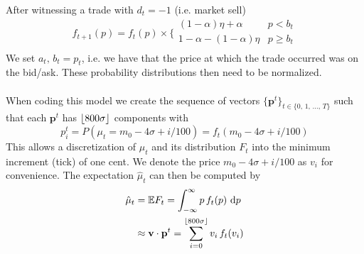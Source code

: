 \documentclass[11pt]{report}
\DeclarePairedDelimiter\floor{\lfloor}{\rfloor}
\begin{document}
    After witnessing a trade with $d_t = -1$ (i.e. market sell)
    \[
    f_{t+1}(p) = f_t(p) \times
    \bigg\{\begin{array}{cc}
        (1 - \alpha)\eta + \alpha & p < b_t \\
        1 - \alpha - (1 - \alpha)\eta & p \geq b_t \\
    \end{array} 
    \]    
    We set $a_t,\,b_t = p_t$, i.e. we have that the price at which the trade occurred 
    was on the bid/ask. These probability distributions then need to be normalized.\\\\
    When coding this model we create the sequence of vectors 
    $\{\mathbf{p}^t\}_{t \in \{0,\,1,\,...,\,T\}}$ such that each $\mathbf{p}^t$ has
    $\floor{800\sigma}$ components with
    \[
    p_i^t = P(\mu_t = m_0 - 4\sigma + i/100) = f_t(m_0 - 4\sigma + i/100)
    \]
    This allows a discretization of $\mu_t$ and its distribution $F_t$ into 
    the minimum increment (tick) of one cent. We denote the price $m_0 - 4\sigma + i/100$ 
    as $v_i$ for convenience. The expectation $\hat{\mu}_t$ can then be computed by
    \begin{align*}
    \hat{\mu}_t & = \mathbb{E}F_t = \int_{-\infty}^{\infty} p\,f_t(p) \,\,\mathrm{d}p \\
    & \approx \mathbf{v}\cdot\mathbf{p}^t
    = \sum_{i=0}^{\floor{800\sigma}} v_i\,f_t(v_i)
    \end{align*}
\end{document}
